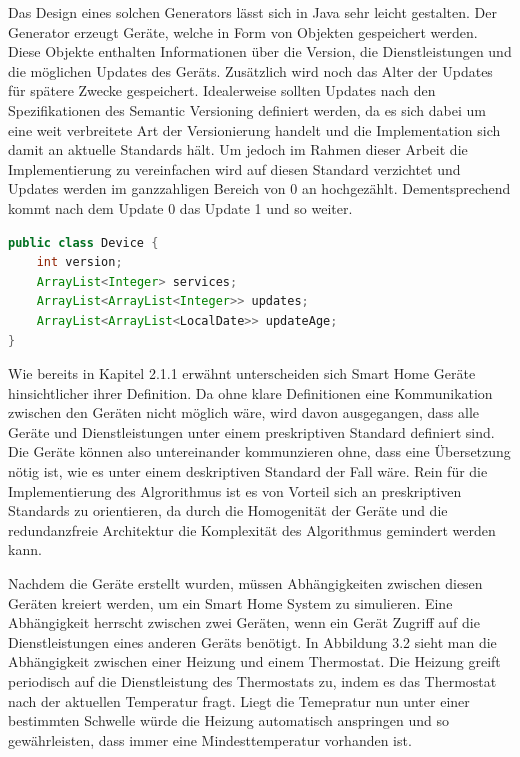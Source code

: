 Das Design eines solchen Generators lässt sich in Java  sehr leicht gestalten.
Der Generator erzeugt Geräte, welche in Form von Objekten gespeichert werden. Diese Objekte enthalten Informationen über
die Version, die Dienstleistungen und die möglichen Updates des Geräts. Zusätzlich wird noch das Alter der Updates für spätere
Zwecke gespeichert. Idealerweise sollten Updates nach den Spezifikationen des Semantic Versioning definiert werden, da es sich
dabei um eine weit verbreitete Art der Versionierung handelt und die Implementation sich damit an aktuelle Standards hält.
Um jedoch im Rahmen dieser Arbeit die Implementierung zu vereinfachen wird auf diesen Standard verzichtet und Updates werden
im ganzzahligen Bereich von 0 an hochgezählt. Dementsprechend kommt nach dem Update 0 das Update 1 und so weiter.
\begin{lstlisting}[language=Java]
public class Device {
    int version;
    ArrayList<Integer> services;
    ArrayList<ArrayList<Integer>> updates;
    ArrayList<ArrayList<LocalDate>> updateAge;
}
\end{lstlisting}
Wie bereits in Kapitel 2.1.1 erwähnt unterscheiden sich Smart Home Geräte hinsichtlicher ihrer Definition.
Da ohne klare Definitionen eine Kommunikation zwischen den Geräten nicht
möglich wäre, wird davon ausgegangen, dass alle Geräte und Dienstleistungen unter einem preskriptiven Standard
definiert sind. Die Geräte können also untereinander kommunzieren ohne, dass eine Übersetzung nötig ist, wie es unter einem deskriptiven
Standard der Fall wäre. Rein für die Implementierung des Algrorithmus ist es von Vorteil sich an preskriptiven Standards zu orientieren, 
da durch die Homogenität der Geräte und die redundanzfreie Architektur die Komplexität des Algorithmus gemindert werden kann.

Nachdem die Geräte erstellt wurden, müssen Abhängigkeiten zwischen diesen Geräten kreiert werden, um 
ein Smart Home System zu simulieren. Eine Abhängigkeit herrscht zwischen zwei Geräten, wenn ein Gerät Zugriff auf die
Dienstleistungen eines anderen Geräts benötigt. In Abbildung 3.2 sieht man die Abhängigkeit zwischen einer Heizung und einem Thermostat.
Die Heizung greift periodisch auf die Dienstleistung des Thermostats zu, indem es das Thermostat nach der aktuellen Temperatur fragt.
Liegt die Temepratur nun unter einer bestimmten Schwelle würde die Heizung automatisch anspringen und so gewährleisten, dass immer eine
Mindesttemperatur vorhanden ist.

